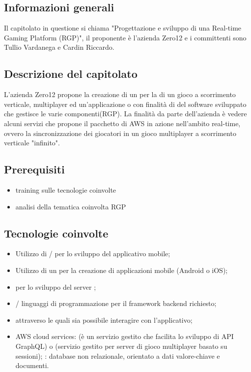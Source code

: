 \subsection{Informazioni generali}
Il capitolato in questione si chiama "Progettazione e sviluppo di una {Real-time Gaming Platform (RGP)}", il proponente è l'azienda Zero12 e i committenti sono Tullio Vardanega e Cardin Riccardo.

\subsection{Descrizione del capitolato}
L’azienda Zero12 propone la creazione di un  per la  di un gioco a scorrimento verticale, multiplayer ed un'applicazione  o  con finalità di  del software sviluppato che gestisce le varie componenti(RGP).
La finalità da parte dell’azienda è vedere alcuni servizi che propone il pacchetto di AWS in azione nell’ambito real-time, ovvero la sincronizzazione dei giocatori in un gioco multiplayer a scorrimento verticale "infinito".
\subsection{Prerequisiti}
\begin{itemize}
\item training sulle tecnologie coinvolte
\item analisi della tematica coinvolta RGP 
\end{itemize}
\subsection{Tecnologie coinvolte}
\begin{itemize}
\item Utilizzo di / per lo sviluppo del applicativo mobile;
\item Utilizzo di un  per la creazione di applicazioni mobile (Android o iOS);
\item {} per lo sviluppo del server ;
\item {}/ linguaggi di programmazione per il framework backend richiesto;
\item {}  attraverso le quali sia possibile interagire con l'applicativo;
\item AWS cloud services: 
(è un servizio gestito che facilita lo sviluppo di API GraphQL) o (servizio gestito per server di gioco multiplayer basato su sessioni);
: database non relazionale, orientato a dati valore-chiave e documenti.
\end{itemize}

